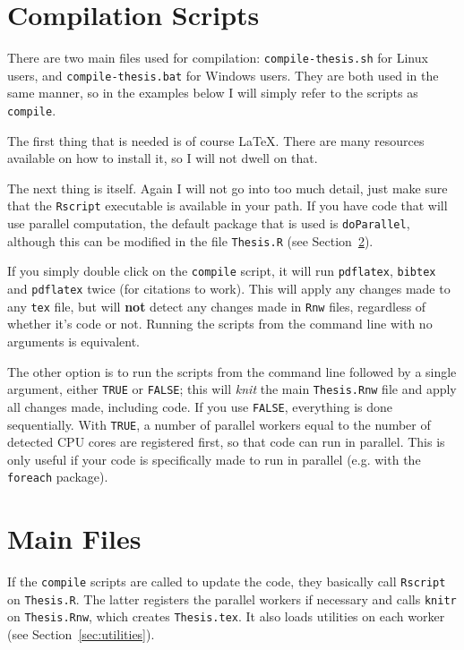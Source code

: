 \section{Compilation Scripts}
\label{sec:comp-scripts}

There are two main files used for compilation: \texttt{compile-thesis.sh} for Linux users, and \texttt{compile-thesis.bat} for Windows users. They are both used in the same manner, so in the examples below I will simply refer to the scripts as \texttt{compile}.

The first thing that is needed is of course \LaTeX{}. There are many resources available on how to install it, so I will not dwell on that.

The next thing is \R{} itself. Again I will not go into too much detail, just make sure that the \texttt{Rscript} executable is available in your path. If you have code that will use parallel computation, the default \R{} package that is used is \texttt{doParallel}, although this can be modified in the file \texttt{Thesis.R} (see Section~\ref{sec:main-files}).

If you simply double click on the \texttt{compile} script, it will run \texttt{pdflatex}, \texttt{bibtex} and \texttt{pdflatex} twice (for citations to work). This will apply any changes made to any \texttt{tex} file, but will \textbf{not} detect any changes made in \texttt{Rnw} files, regardless of whether it's \R{} code or not. Running the scripts from the command line with no arguments is equivalent.

The other option is to run the scripts from the command line followed by a single argument, either \texttt{TRUE} or \texttt{FALSE}; this will \textit{knit} the main \texttt{Thesis.Rnw} file and apply all changes made, including \R{} code. If you use \texttt{FALSE}, everything is done sequentially. With \texttt{TRUE}, a number of parallel workers equal to the number of detected CPU cores are registered first, so that \R{} code can run in parallel. This is only useful if your code is specifically made to run in parallel (e.g. with the \texttt{foreach} package).

\section{Main Files}
\label{sec:main-files}

If the \texttt{compile} scripts are called to update the \R{} code, they basically call \texttt{Rscript} on \texttt{Thesis.R}. The latter registers the parallel workers if necessary and calls \texttt{knitr} on \texttt{Thesis.Rnw}, which creates \texttt{Thesis.tex}. It also loads \R{} utilities on each worker (see Section~\ref{sec:utilities}).

